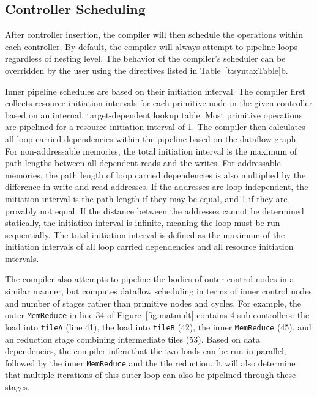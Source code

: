 {%


\subsection{Controller Scheduling}
\label{scheduling}
After controller insertion, the compiler will then schedule the operations within each controller.
By default, the compiler will always attempt to pipeline loops regardless of nesting level.
The behavior of the compiler's scheduler can be overridden by the user using the directives listed in Table~\ref{t:syntaxTable}b.

Inner pipeline schedules are based on their initiation interval.
The compiler first collects resource initiation intervals for each primitive node in the given controller based on an internal, target-dependent lookup table.
Most primitive operations are pipelined for a resource initiation interval of 1.
The compiler then calculates all loop carried dependencies within the pipeline based on the dataflow graph.
For non-addressable memories, the total initiation interval is the maximum of path lengths between all dependent reads and the writes.
For addressable memories, the path length of loop carried dependencies is also multiplied by the difference in write and read addresses.
If the addresses are loop-independent, the initiation interval is the path length if they may be equal, and 1 if they are provably not equal. If the distance between the addresses cannot be determined statically, the initiation interval is infinite, meaning the loop must be run sequentially.
The total initiation interval is defined as the maximum of the initiation intervals of all loop carried dependencies and all resource initiation intervals.

The compiler also attempts to pipeline the bodies of outer control nodes in a similar manner, but computes dataflow scheduling in terms of inner control nodes and number of stages rather than primitive nodes and cycles. For example, the outer \texttt{\small{MemReduce}} in line 34 of Figure~\ref{fig:matmult} contains 4 sub-controllers: the load into \texttt{\small{tileA}} (line 41), the load into \texttt{\small{tileB}} (42), the inner \texttt{\small{MemReduce}} (45), and an reduction stage combining intermediate tiles (53). Based on data dependencies, the compiler infers that the two loads can be run in parallel, followed by the inner \texttt{\small{MemReduce}} and the tile reduction. It will also determine that multiple iterations of this outer loop can also be pipelined through these stages.

}

